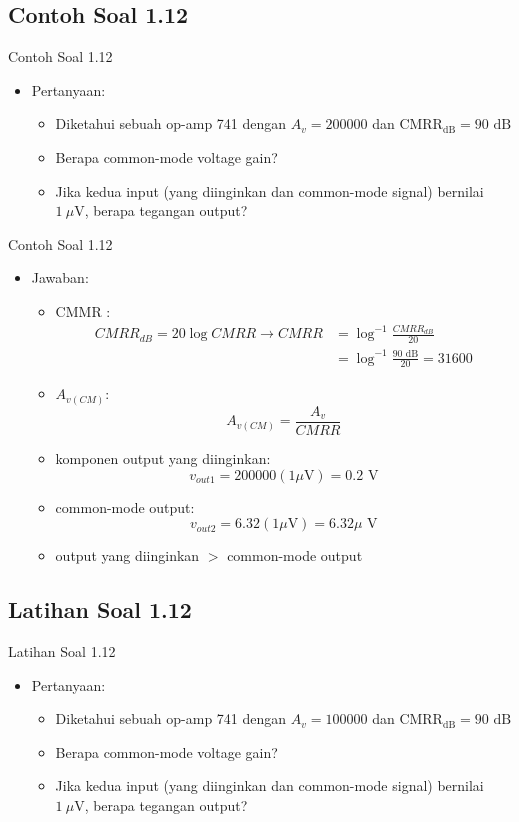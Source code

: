 \documentclass[aspectratio=169]{beamer}
\begin{document}
\subsection{Contoh Soal 1.12}
\begin{frame}{Contoh Soal 1.12}
	\begin{itemize}
		\item Pertanyaan:
		\begin{itemize}
			\item Diketahui sebuah op-amp 741 dengan $ A_v = 200000 $ dan $ \text{CMRR}_\text{dB} = 90 \text{ dB}$
			\item Berapa common-mode voltage gain?
			\item Jika kedua input (yang diinginkan dan common-mode signal) bernilai $ 1~\mu\text{V} $, berapa tegangan output?
		\end{itemize}
	\end{itemize}
\end{frame}

\begin{frame}{Contoh Soal 1.12}
	\begin{itemize}
		\item Jawaban:
		\begin{itemize}
			\item CMMR :
			\begin{align*}
				CMRR_{dB} = 20 \log CMRR \rightarrow CMRR &= \log^{-1}\frac{ CMRR_{dB} }{20} \\
				&= \log^{-1} \frac{ 90 \text{ dB} }{20} = 31600
			\end{align*}
			\item $ A_{v(CM)} $:
			\[ A_{v(CM)} =  \frac{A_v}{CMRR} \]
			\item komponen output yang diinginkan:
			\[ v_{out1} = 200000(1 \mu\text{V}) = 0.2 \text{ V} \]
			\item common-mode output:
			\[ v_{out2} = 6.32(1 \mu\text{V}) = 6.32 \mu\text{ V} \]
			\item output yang diinginkan $ > $ common-mode output
		\end{itemize}
	\end{itemize}
\end{frame}

\subsection{Latihan Soal 1.12}
\begin{frame}{Latihan Soal 1.12}
	\begin{itemize}
		\item Pertanyaan:
		\begin{itemize}
			\item Diketahui sebuah op-amp 741 dengan $ A_v = 100000 $ dan $ \text{CMRR}_\text{dB} = 90 \text{ dB}$
			\item Berapa common-mode voltage gain?
			\item Jika kedua input (yang diinginkan dan common-mode signal) bernilai $ 1~\mu\text{V} $, berapa tegangan output?
		\end{itemize}
	\end{itemize}
\end{frame}
\end{document}
